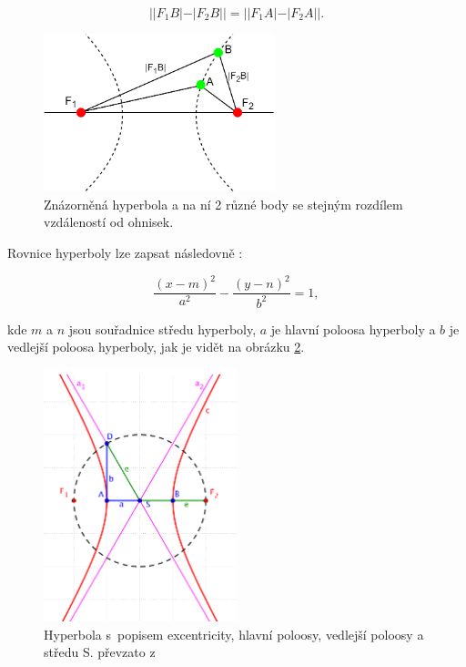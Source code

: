 \begin{equation}
||F_1 B|-|F_2 B||=||F_1 A|-|F_2 A||.
	\label{hyp_def}
\end{equation}

\begin{figure}[hbt]
	\centering
	\includegraphics[width=0.6\textwidth]{obrazky-figures/hyperbola_def.png}
	\caption{Znázorněná hyperbola a na ní 2 různé body se stejným rozdílem vzdáleností od ohnisek.}
	\label{pic:hypdef1}
\end{figure}

Rovnice hyperboly lze zapsat následovně \cite{hyperbola}:

\begin{equation}
	\frac{(x-m)^2}{a^2}-\frac{(y-n)^2}{b^2}=1,
	\label{rovnice_hyperbola}
\end{equation}

kde $m$ a $n$ jsou souřadnice středu hyperboly, $a$ je hlavní poloosa hyperboly a $b$ je vedlejší poloosa hyperboly, jak je vidět na obrázku \ref{pic:hypdef2}.

\begin{figure}[hbt]
	\centering
	\includegraphics[width=0.5\textwidth]{obrazky-figures/hyperbola_def2.png}
	\caption{Hyperbola s~popisem excentricity, hlavní poloosy, vedlejší poloosy a středu S. převzato z~\cite{hyperbola}}
	\label{pic:hypdef2}
\end{figure}

